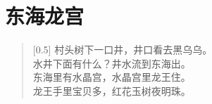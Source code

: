 \documentclass[12pt,UTF-8,openany]{ctexbook}
\begin{document}
\hanzibox{}\hanzibox{}\hanzibox{}\hanzibox{}\hspace{1em}\hanzibox{}\hanzibox{}\hanzibox{}\hanzibox{}

\hanzibox{}\hanzibox{}\hanzibox{}\hanzibox{}\hspace{1em}\hanzibox{}\hanzibox{}\hanzibox{}\hanzibox{}






\chapter{东海龙宫}

\begin{large}
    
    \begin{verse}[0.5\linewidth]
        村头树下一口井，井口看去黑乌乌。 \\
        水井下面有什么？井水流到东海出。 \\
        东海里有水晶宫，水晶宫里龙王住。 \\
        龙王手里宝贝多，红花玉树夜明珠。
    \end{verse}
    
\end{large}


\clearpage

\begin{center}
    
    
\end{center}


\hanzibox{}\hanzibox{}\hanzibox{}\hanzibox{}\hspace{1em}\hanzibox{}\hanzibox{}\hanzibox{}\hanzibox{}

\hanzibox{}\hanzibox{}\hanzibox{}\hanzibox{}\hspace{1em}\hanzibox{}\hanzibox{}\hanzibox{}\hanzibox{}

\hanzibox{}\hanzibox{}\hanzibox{}\hanzibox{}\hspace{1em}\hanzibox{}\hanzibox{}\hanzibox{}\hanzibox{}

\hanzibox{}\hanzibox{}\hanzibox{}\hanzibox{}\hspace{1em}\hanzibox{}\hanzibox{}\hanzibox{}\hanzibox{}
\end{document}

